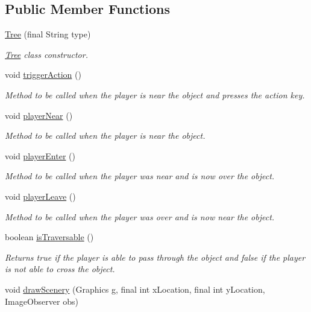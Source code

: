 \subsection*{Public Member Functions}
\begin{DoxyCompactItemize}
\item 
\hyperlink{a00033_a06acd38739c0360bbb1a30e59024d2ba}{Tree} (final String type)
\begin{DoxyCompactList}\small\item\em \hyperlink{a00033}{Tree} class constructor. \end{DoxyCompactList}\item 
void \hyperlink{a00033_a273e28b5881ded9ee71e59d6d5733e70}{trigger\-Action} ()
\begin{DoxyCompactList}\small\item\em Method to be called when the player is near the object and presses the action key. \end{DoxyCompactList}\item 
void \hyperlink{a00033_ad77fdbe4c5134b565dbee2acb74a937d}{player\-Near} ()
\begin{DoxyCompactList}\small\item\em Method to be called when the player is near the object. \end{DoxyCompactList}\item 
void \hyperlink{a00033_acfcba6dd6fbd6cebb54b4bbfe22b071e}{player\-Enter} ()
\begin{DoxyCompactList}\small\item\em Method to be called when the player was near and is now over the object. \end{DoxyCompactList}\item 
void \hyperlink{a00033_a41f658609a997f04252ac1f602ed4ac7}{player\-Leave} ()
\begin{DoxyCompactList}\small\item\em Method to be called when the player was over and is now near the object. \end{DoxyCompactList}\item 
boolean \hyperlink{a00033_adb76d3bf389981034e765c0c0f29de6a}{is\-Traversable} ()
\begin{DoxyCompactList}\small\item\em Returns true if the player is able to pass through the object and false if the player is not able to cross the object. \end{DoxyCompactList}\item 
void \hyperlink{a00024_a626c1ae7fa15d2f96d564c35368fdbc9}{draw\-Scenery} (Graphics g, final int x\-Location, final int y\-Location, Image\-Observer obs)
\end{DoxyCompactItemize}
